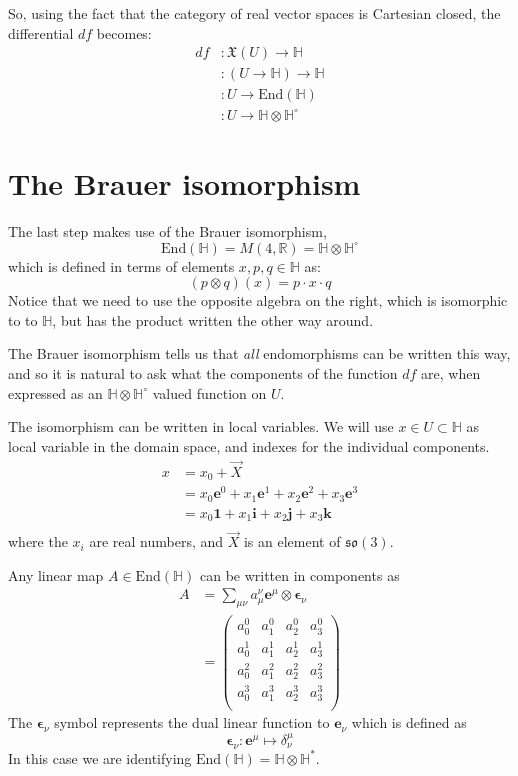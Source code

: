 \documentclass{amsart}
\providecommand{\R}{\mathbb{R}}
\providecommand{\HH}{\mathbb{H}}
\providecommand{\so}{\mathfrak{so}}
\newcommand{\End}{\mathrm{End}}
\newcommand{\e}{\boldsymbol{e}}
\newcommand{\ep}{\boldsymbol{\epsilon}}
\newcommand{\1}{\boldsymbol{1}}
\renewcommand{\i}{\boldsymbol{i}}
\renewcommand{\j}{\boldsymbol{j}}
\renewcommand{\k}{\boldsymbol{k}}
\begin{document}
So, using the fact that the category of real vector spaces is Cartesian closed,
the differential $df$ becomes:
\begin{align*}
  df &: \mathfrak{X}(U) \to \HH \\
     &: (U \to \HH) \to \HH \\
     &: U \to \End(\HH) \\
     &: U \to \HH \otimes \HH^\circ
\end{align*}



\section{The Brauer isomorphism}

The last step makes use of the Brauer isomorphism,
$$ \End(\HH) = M(4, \R) = \HH \otimes \HH^\circ $$
which is defined in terms of elements $x,p,q\in\HH$ as:
$$ (p\otimes q)(x) = p \cdot x \cdot q $$
Notice that we need to use the opposite algebra on the right, which is
isomorphic to to $\HH$, but has the product written the other way around.

The Brauer isomorphism tells us that \emph{all} endomorphisms can be written
this way, and so it is natural to ask what the components of the function $df$
are, when expressed as an $\HH\otimes\HH^\circ$ valued function on $U$.

The isomorphism can be written in local variables. We will use $x\in U\subset
\HH$ as local variable in the domain space, and indexes for the individual
components.
\begin{align*}
  x &= x_0 + \vec{X} \\
    &= x_0\e^0 + x_1\e^1 + x_2\e^2 + x_3\e^3 \\
    &= x_0\1 + x_1\i + x_2\j + x_3\k \\
\end{align*}
where the $x_i$ are real numbers, and $\vec{X}$ is an element of $\so(3)$.

Any linear map $A \in \End(\HH) $ can be written in components as
\begin{align*}
  A &= \sum_{\mu\nu} a_\mu^\nu \e^\mu \otimes \ep_\nu \\
    &= \begin{pmatrix}
      a_0^0 & a_1^0 & a_2^0 & a_3^0 \\
      a_0^1 & a_1^1 & a_2^1 & a_3^1 \\
      a_0^2 & a_1^2 & a_2^2 & a_3^2 \\
      a_0^3 & a_1^3 & a_2^3 & a_3^3 \\
    \end{pmatrix}
\end{align*}
The $\ep_\nu$ symbol represents the dual linear function to $\e_\nu$ which is defined as
$$\ep_\nu : \e^\mu \mapsto \delta_\nu^\mu$$
In this case we are identifying $\End(\HH) = \HH\otimes\HH^*$.
\end{document}
